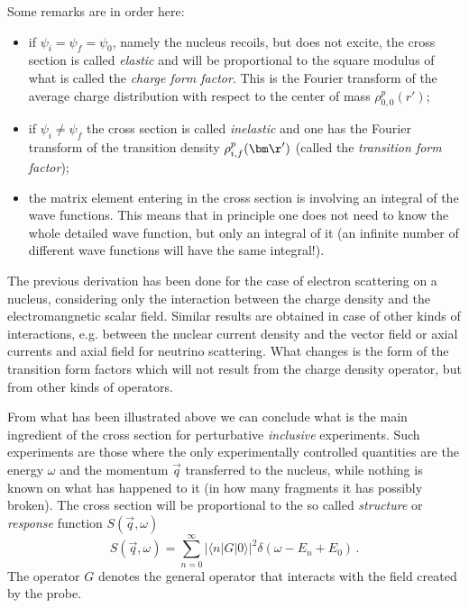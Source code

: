 Some remarks are in order here: 

\begin{itemize}
 \item if $\psi_i=\psi_f=\psi_0$, namely the nucleus recoils, but does not 
excite, the cross section is called {\it elastic} and will be proportional to the square modulus of what is called
the {\it charge form factor}. This is the Fourier transform of the average charge distribution 
with respect to the center of mass $\rho_{0,0}^p(r')$; 
\item if $\psi_i\neq\psi_f$ the cross section is called {\it inelastic}
and one has the Fourier transform of the transition density $\rho^p_{i,f}(\vec \r')$ (called the {\it transition form factor});
\item the matrix element entering in the cross section is involving an integral 
of the wave functions. This means that in principle one does not need to know the whole detailed wave function, but only an 
integral of it (an infinite number of different wave functions will have the same integral!).
\end{itemize}

The previous derivation has been done for the case of electron scattering on a nucleus,
considering only the interaction between the charge density and the electromangnetic scalar field. 
Similar results are obtained in case of other kinds of interactions, e.g. 
between the nuclear current density and the vector  field or axial currents and axial  field for neutrino scattering.
What changes is the form of the transition form factors which will not result from the charge density operator, 
but from other kinds of operators. 

From what has been illustrated above  we can conclude what is the main ingredient of the cross section 
for  perturbative {\it inclusive} experiments. Such experiments are those where
the only experimentally controlled quantities are the energy $\omega$ and the momentum $\vec q$ transferred 
to the nucleus, while nothing is known on what has happened to it (in how many fragments it has possibly broken).
The cross section will be proportional to the so called {\it structure} or {\it response} function
$S(\vec q, \omega)$
\begin{equation}\label{S}
S(\vec q,\omega)= \sum_{n=0}^\infty |\langle n|G|0\rangle|^2 \delta(\omega-E_n+E_0)\,.
\end{equation}
The operator $G$ denotes the general operator that interacts with the field created by the probe.

